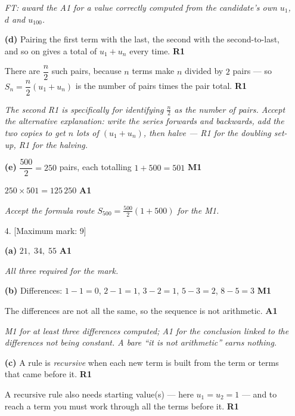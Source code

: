 \documentclass[12pt, twoside]{article}
\begin{document}
\begin{enumerate}[itemsep=0.3cm]
\emph{FT: award the A1 for a value correctly computed from the candidate's own
$u_{1}$, $d$ and $u_{100}$.}

\medskip

\textbf{(d)} Pairing the first term with the last, the second with the
second-to-last, and so on gives a total of $u_{1} + u_{n}$ every time.
\hfill \textbf{R1}

There are $\dfrac{n}{2}$ such pairs, because $n$ terms make $n$ divided by
$2$ pairs --- so $S_{n} = \dfrac{n}{2}(u_{1} + u_{n})$ is the number of pairs
times the pair total. \hfill \textbf{R1}

\emph{The second R1 is specifically for identifying $\frac{n}{2}$ as the
number of pairs. Accept the alternative explanation: write the series
forwards and backwards, add the two copies to get $n$ lots of
$(u_{1} + u_{n})$, then halve --- R1 for the doubling set-up, R1 for the
halving.}

\medskip

\textbf{(e)} $\dfrac{500}{2} = 250$ pairs, each totalling $1 + 500 = 501$
\hfill \textbf{M1}

$250 \times 501 = 125\,250$ \hfill \textbf{A1}

\emph{Accept the formula route $S_{500} = \frac{500}{2}(1 + 500)$ for the M1.}

\newpage

\item[4.] [Maximum mark: 9]

\medskip

\textbf{(a)} $21,\; 34,\; 55$ \hfill \textbf{A1}

\emph{All three required for the mark.}

\medskip

\textbf{(b)} Differences: $1 - 1 = 0$, \quad $2 - 1 = 1$, \quad
$3 - 2 = 1$, \quad $5 - 3 = 2$, \quad $8 - 5 = 3$ \hfill \textbf{M1}

The differences are not all the same, so the sequence is not arithmetic.
\hfill \textbf{A1}

\emph{M1 for at least three differences computed; A1 for the conclusion
linked to the differences not being constant. A bare ``it is not
arithmetic'' earns nothing.}

\medskip

\textbf{(c)} A rule is \emph{recursive} when each new term is built from the
term or terms that came before it. \hfill \textbf{R1}

A recursive rule also needs starting value(s) --- here $u_{1} = u_{2} = 1$ ---
and to reach a term you must work through all the terms before it.
\hfill \textbf{R1}


\end{enumerate}
\end{document}
